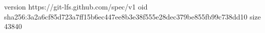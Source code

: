 version https://git-lfs.github.com/spec/v1
oid sha256:3a2a6cf85d723a7ff15b6ec447ee8b3e38f555e28dec379be855fb99c738dd10
size 43840
